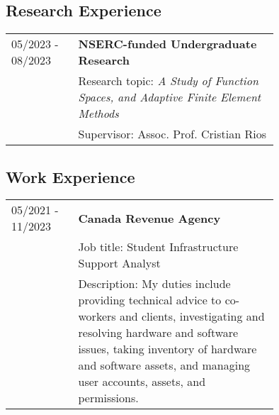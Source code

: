 \documentclass[12pt]{article}
\begin{document}
\subsection*{Research Experience}
\begin{tabular}{l p{0.75\linewidth}}
05/2023 - 08/2023&\textbf{NSERC-funded Undergraduate Research}\\
		      &Research topic: \textit{A Study of Function Spaces, and Adaptive Finite Element Methods}\\
		      &Supervisor: Assoc. Prof. Cristian Rios
\end{tabular}
\subsection*{Work Experience}
\begin{tabular}{l p{0.75\linewidth}}
05/2021 - 11/2023&\textbf{Canada Revenue Agency}\\
	            &Job title: Student Infrastructure Support Analyst\\
		    &Description: My duties include providing technical advice to co-workers and clients,
		     investigating and resolving hardware and software issues,
                     taking inventory of hardware and software assets, and managing user accounts, assets, and permissions.
\end{tabular}
\newpage
\end{document}
